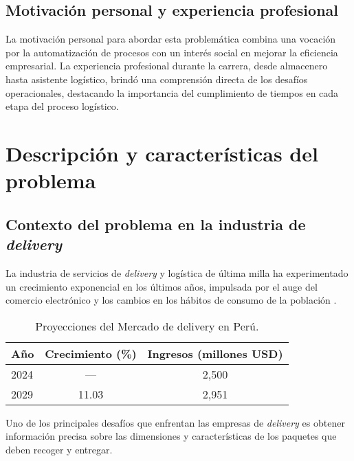 \subsection{Motivación personal y experiencia profesional}

La motivación personal para abordar esta problemática combina una vocación por la automatización de procesos con un interés social en mejorar la eficiencia empresarial. La experiencia profesional durante la carrera, desde almacenero hasta asistente logístico, brindó una comprensión directa de los desafíos operacionales, destacando la importancia del cumplimiento de tiempos en cada etapa del proceso logístico.

\section{Descripción y características del problema}

\subsection{Contexto del problema en la industria de \textit{delivery}}

La industria de servicios de \textit{delivery} y logística de última milla ha experimentado un crecimiento exponencial en los últimos años, impulsada por el auge del comercio electrónico y los cambios en los hábitos de consumo de la población \cite{RedacciponTLW2025}. 

\begin{table}[H]
\centering
\caption{Proyecciones del Mercado de delivery en Perú.}
\label{tab:proyecciones_delivery}
\begin{tabular}{@{}lcc@{}}
\toprule
\textbf{Año} & \textbf{Crecimiento (\%)} & \textbf{Ingresos (millones USD)} \\
\midrule
2024 & --- & 2,500 \\
2029 & 11.03 & 2,951 \\
\bottomrule
\end{tabular}
\end{table}

Uno de los principales desafíos que enfrentan las empresas de \textit{delivery} es obtener información precisa sobre las dimensiones y características de los paquetes que deben recoger y entregar.

